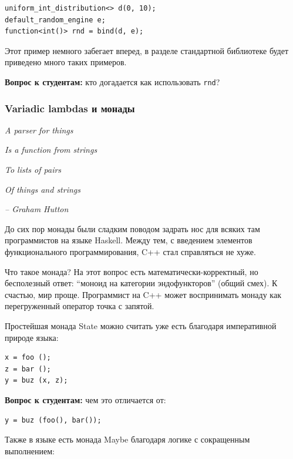 \documentclass[a4paper,12pt,oneside]{article}
\newif\ifanswers
\begin{document}
\begin{lstlisting}
uniform_int_distribution<> d(0, 10);
default_random_engine e;
function<int()> rnd = bind(d, e);
\end{lstlisting}

Этот пример немного забегает вперед, в разделе стандартной библиотеке будет приведено много таких примеров.

\textbf{Вопрос к студентам:} кто догадается как использовать \lstinline!rnd!?

\ifanswers
Правильный ответ: просто вызвать.
\fi

\subsubsection{Variadic lambdas и монады}\label{Monads}

\hfill\textit{A parser for things}

\hfill\textit{Is a function from strings}

\hfill\textit{To lists of pairs}

\hfill\textit{Of things and strings}{\vspace{0.5em}}

\hfill\textit{-- Graham Hutton}

До сих пор монады были сладким поводом задрать нос для всяких там программистов на языке Haskell. Между тем, с введением элементов функционального программирования, C++ стал справляться не хуже.

Что такое монада? На этот вопрос есть математически-корректный, но бесполезный ответ: ``моноид на категории эндофункторов'' (общий смех). К счастью, мир проще. Программист на C++ может воспринимать монаду как перегруженный оператор точка с запятой.

Простейшая монада State можно считать уже есть благодаря императивной природе языка:

\begin{lstlisting}
x = foo ();
z = bar ();
y = buz (x, z);
\end{lstlisting}

\textbf{Вопрос к студентам:} чем это отличается от:

\begin{lstlisting}
y = buz (foo(), bar());
\end{lstlisting}

\ifanswers
Правильный ответ: задана последовательность выполнения функций \lstinline!foo! и \lstinline!bar! 
\fi

Также в языке есть монада Maybe благодаря логике с сокращенным выполнением:
\end{document}
